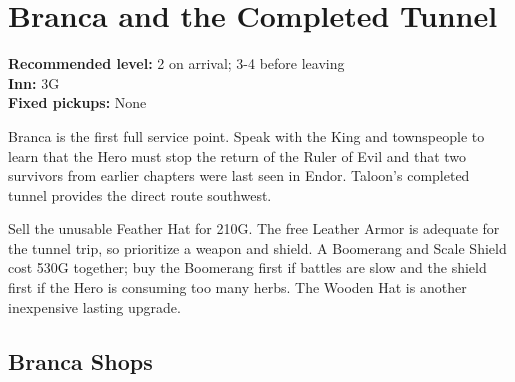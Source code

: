 \documentclass[
  american,
  10pt,
  letterpaper,
  oneside,
  open=any]{scrreprt}
\begin{document}
\section{Branca and the Completed
Tunnel}\label{branca-and-the-completed-tunnel}

\textbf{Recommended level:} 2 on arrival; 3-4 before leaving\\
\textbf{Inn:} 3G\\
\textbf{Fixed pickups:} None

Branca is the first full service point. Speak with the King and
townspeople to learn that the Hero must stop the return of the Ruler of
Evil and that two survivors from earlier chapters were last seen in
Endor. Taloon's completed tunnel provides the direct route southwest.

Sell the unusable Feather Hat for 210G. The free Leather Armor is
adequate for the tunnel trip, so prioritize a weapon and shield. A
Boomerang and Scale Shield cost 530G together; buy the Boomerang first
if battles are slow and the shield first if the Hero is consuming too
many herbs. The Wooden Hat is another inexpensive lasting upgrade.

\subsection{Branca Shops}\label{branca-shops}
\end{document}
